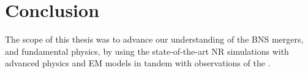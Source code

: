 \section{Conclusion}\label{sec:conclusion:conclusion}



The scope of this thesis was to advance our understanding of the \ac{BNS} mergers,
and fundamental physics, by using the state-of-the-art \ac{NR} simulations with
advanced physics and \ac{EM} models in tandem with \mm{} observations of the 
\GW{}. 






